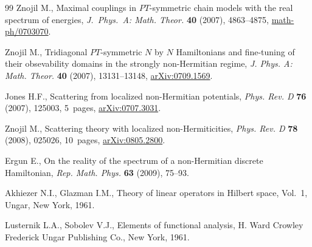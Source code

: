 \documentclass[11pt]{article}
\numberwithin{equation}{section}
\begin{document}
\begin{thebibliography}{99}
\bibitem[11]{[11]} Znojil M., Maximal couplings in $PT$-symmetric chain models
with the real spectrum of energies, \textit{J.~Phys.~A: Math. Theor.}
\textbf{40} (2007), 4863--4875, \href{http://arxiv.org/abs/math-ph/0703070}{math-ph/0703070}.

\bibitem[12]{[12]} Znojil M., Tridiagonal $PT$-symmetric $N$ by $N$ Hamiltonians
and f\/ine-tuning of their obsevability domains in the strongly non-Hermitian
regime, \textit{J. Phys. A: Math. Theor.} \textbf{40} (2007), 13131--13148, \href{http://arxiv.org/abs/0709.1569}{arXiv:0709.1569}.

\bibitem[13]{[13]} Jones H.F., Scattering from localized non-Hermitian potentials, \textit{Phys. Rev. D} \textbf{76} (2007), 125003, 5~pages, \href{http://arxiv.org/abs/0707.3031}{arXiv:0707.3031}.

\bibitem[14]{[14]} Znojil M., Scattering theory with localized
non-Hermiticities, \textit{Phys. Rev. D} \textbf{78} (2008), 025026, 10~pages, \href{http://arxiv.org/abs/0805.2800}{arXiv:0805.2800}.

\bibitem[15]{[15]} Ergun E., On the reality of the spectrum of a non-Hermitian
discrete Hamiltonian, \textit{Rep. Math. Phys.} \textbf{63} (2009), 75--93.

\bibitem[16]{[16]} Akhiezer N.I., Glazman I.M., Theory of linear operators in
Hilbert space, Vol.~1, Ungar, New York, 1961.

\bibitem[17]{[17]} Lusternik L.A., Sobolev V.J., Elements of functional
analysis, H. Ward Crowley Frederick Ungar Publishing Co., New York, 1961.

\end{thebibliography}
\end{document}
